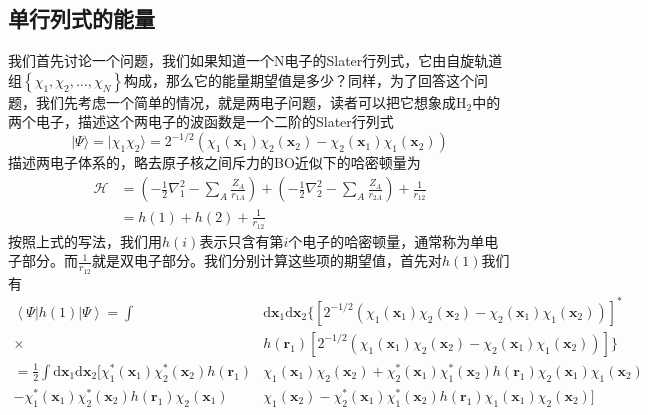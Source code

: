 \documentclass[12pt,a4paper,openany,twoside]{book}
\numberwithin{equation}{section}
\begin{document}
        \subsection{单行列式的能量}
          我们首先讨论一个问题，我们如果知道一个N电子的Slater行列式，它由自旋轨道组$\left\{\chi_1, \chi_2,\dots,\chi_N\right\}$构成，那么它的能量期望值是多少？同样，为了回答这个问题，我们先考虑一个简单的情况，就是两电子问题，读者可以把它想象成$\text{H}_2$中的两个电子，描述这个两电子的波函数是一个二阶的Slater行列式
          \begin{equation}
            |\Psi\rangle = |\chi_1 \chi_2\rangle=2^{-1 / 2}\left(\chi_{1}\left(\mathbf{x}_{1}\right) \chi_{2}\left(\mathbf{x}_{2}\right)-\chi_{2}\left(\mathbf{x}_{1}\right) \chi_{1}\left(\mathbf{x}_{2}\right)\right)
          \end{equation}
          描述两电子体系的，略去原子核之间斥力的BO近似下的哈密顿量为
          \begin{equation}
            \begin{aligned} \mathscr{H} &=\left(-\frac{1}{2} \nabla_{1}^{2}-\sum_{A} \frac{Z_{A}}{r_{1 A}}\right)+\left(-\frac{1}{2} \nabla_{2}^{2}-\sum_{A} \frac{Z_{A}}{r_{2 A}}\right)+\frac{1}{r_{12}} \\ &=h(1)+h(2)+\frac{1}{r_{12}} \end{aligned}
          \end{equation}
          按照上式的写法，我们用$h(i)$表示只含有第$i$个电子的哈密顿量，通常称为单电子部分。而$\frac{1}{r_{12}}$就是双电子部分。我们分别计算这些项的期望值，首先对$h(1)$我们有
          \begin{equation}
            \begin{aligned}
              \left\langle\Psi|h(1)| \Psi \right\rangle=\int &\mathrm{d} \mathbf{x}_{1} \mathrm{d} \mathbf{x}_{2} \{ \left[2^{-1 / 2}\left(\chi_{1}\left(\mathbf{x}_{1}\right) \chi_{2}\left(\mathbf{x}_{2}\right)-\chi_{2}\left(\mathbf{x}_{1}\right) \chi_{1}\left(\mathbf{x}_{2}\right)\right)\right]^{*} \\ 
              \times& h\left(\mathbf{r}_{1}\right)\left[2^{-1 / 2}\left(\chi_{1}\left(\mathbf{x}_{1}\right) \chi_{2}\left(\mathbf{x}_{2}\right)-\chi_{2}\left(\mathbf{x}_{1}\right) \chi_{1}\left(\mathbf{x}_{2}\right)\right)\right] \} \\
              =\frac{1}{2} \int \mathrm{d} \mathbf{x}_{1} \mathrm{d} \mathbf{x}_{2} [\chi_{1}^{*}\left(\mathbf{x}_{1}\right) \chi_{2}^{*}\left(\mathbf{x}_{2}\right) h\left(\mathbf{r}_{1}\right) &\chi_{1}\left(\mathbf{x}_{1}\right) \chi_{2}\left(\mathbf{x}_{2}\right)+\chi_{2}^{*}\left(\mathbf{x}_{1}\right) \chi_{1}^{*}\left(\mathbf{x}_{2}\right) h\left(\mathbf{r}_{1}\right) \chi_{2}\left(\mathbf{x}_{1}\right) \chi_{1}\left(\mathbf{x}_{2}\right)\\
              -\chi_{1}^{*}\left(\mathbf{x}_{1}\right) \chi_{2}^{*}\left(\mathbf{x}_{2}\right) h\left(\mathbf{r}_{1}\right) \chi_{2}\left(\mathbf{x}_{1}\right) &\chi_{1}\left(\mathbf{x}_{2}\right)-\chi_{2}^{*}\left(\mathbf{x}_{1}\right) \chi_{1}^{*}\left(\mathbf{x}_{2}\right) h\left(\mathbf{r}_{1}\right) \chi_{1}\left(\mathbf{x}_{1}\right) \chi_{2}\left(\mathbf{x}_{2}\right) ]
            \end{aligned}
          \end{equation}
\end{document}
